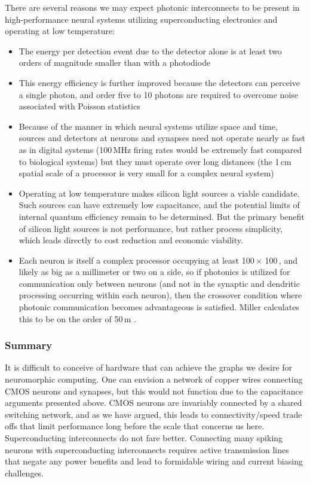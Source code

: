 \vspace{3em}
There are several reasons we may expect photonic interconnects to be present in high-performance neural systems utilizing superconducting electronics and operating at low temperature:
\begin{itemize}
\item The energy per detection event due to the detector alone is at least two orders of magnitude smaller than with a photodiode
\item This energy efficiency is further improved because the detectors can perceive a single photon, and order five to 10 photons are required to overcome noise associated with Poisson statistics
\item Because of the manner in which neural systems utilize space and time, sources and detectors at neurons and synapses need not operate nearly as fast as in digital systems (100\,MHz firing rates would be extremely fast compared to biological systems) but they must operate over long distances (the 1\,cm spatial scale of a processor is very small for a complex neural system)
\item Operating at low temperature makes silicon light sources a viable candidate. Such sources can have extremely low capacitance, and the potential limits of internal quantum efficiency remain to be determined. But the primary benefit of silicon light sources is not performance, but rather process simplicity, which leads directly to cost reduction and economic viability.
\item Each neuron is itself a complex processor occupying at least 100\,\textmu $\times$ 100\,\textmu, and likely as big as a millimeter or two on a side, so if photonics is utilized for communication only between neurons (and not in the synaptic and dendritic processing occurring within each neuron), then the crossover condition where photonic communication becomes advantageous is satisfied. Miller calculates this to be on the order of 50\,\textmu m \cite{mi2009}.
\end{itemize}

\subsubsection{Summary}
It is difficult to conceive of hardware that can achieve the graphs we desire for neuromorphic computing. One can envision a network of copper wires connecting CMOS neurons and synapses, but this would not function due to the capacitance arguments presented above. CMOS neurons are invariably connected by a shared switching network, and as we have argued, this leads to connectivity/speed trade offs that limit performance long before the scale that concerns us here. Superconducting interconnects do not fare better. Connecting many spiking neurons with superconducting interconnects requires active transmission lines that negate any power benefits and lead to formidable wiring and current biasing challenges. 

